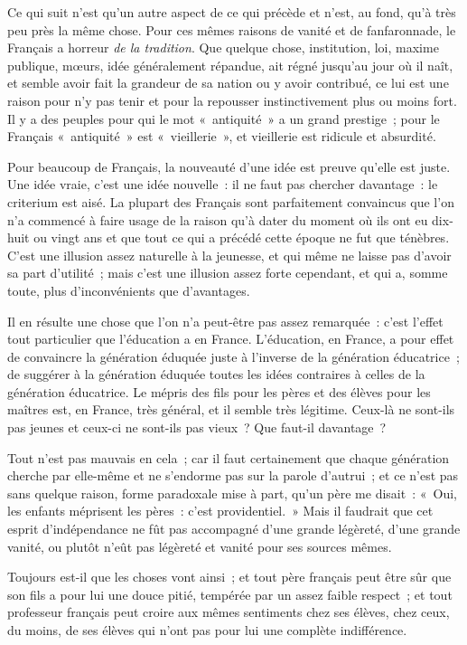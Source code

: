 \documentclass[french,twoside]{book} %
\begin{document}
\noindent Ce qui suit n’est qu’un autre aspect de ce qui précède et n’est, au fond, qu’à très peu près la même chose. Pour ces mêmes raisons de vanité et de fanfaronnade, le Français a horreur {\itshape de la tradition}. Que quelque chose, institution, loi, maxime publique, mœurs, idée généralement répandue, ait régné jusqu’au jour où il naît, et semble avoir fait la grandeur de sa nation ou y avoir contribué, ce lui est une raison pour n’y pas tenir et pour la  repousser instinctivement plus ou moins fort. Il y a des peuples pour qui le mot « antiquité » a un grand prestige ; pour le Français « antiquité » est « vieillerie », et vieillerie est ridicule et absurdité.\par
Pour beaucoup de Français, la nouveauté d’une idée est preuve qu’elle est juste. Une idée vraie, c’est une idée nouvelle : il ne faut pas chercher davantage : le criterium est aisé. La plupart des Français sont parfaitement convaincus que l’on n’a commencé à faire usage de la raison qu’à dater du moment où ils ont eu dix-huit ou vingt ans et que tout ce qui a précédé cette époque ne fut que ténèbres. C’est une illusion assez naturelle à la jeunesse, et qui même ne laisse pas d’avoir sa part d’utilité ; mais c’est une illusion assez forte cependant, et qui a, somme toute, plus d’inconvénients que d’avantages.\par
Il en résulte une chose que l’on n’a peut-être pas assez remarquée : c’est l’effet tout particulier que l’éducation a en France. L’éducation, en France, a pour effet de convaincre la génération éduquée juste à l’inverse de la génération éducatrice ; de suggérer à la génération éduquée toutes les idées contraires à celles de la génération éducatrice. Le mépris des fils pour les pères et des élèves pour les maîtres est, en France, très général, et il semble  très légitime. Ceux-là ne sont-ils pas jeunes et ceux-ci ne sont-ils pas vieux ? Que faut-il davantage ?\par
Tout n’est pas mauvais en cela ; car il faut certainement que chaque génération cherche par elle-même et ne s’endorme pas sur la parole d’autrui ; et ce n’est pas sans quelque raison, forme paradoxale mise à part, qu’un père me disait : « Oui, les enfants méprisent les pères : c’est providentiel. » Mais il faudrait que cet esprit d’indépendance ne fût pas accompagné d’une grande légèreté, d’une grande vanité, ou plutôt n’eût pas légèreté et vanité pour ses sources mêmes.\par
Toujours est-il que les choses vont ainsi ; et tout père français peut être sûr que son fils a pour lui une douce pitié, tempérée par un assez faible respect ; et tout professeur français peut croire aux mêmes sentiments chez ses élèves, chez ceux, du moins, de ses élèves qui n’ont pas pour lui une complète indifférence.\par
\end{document}
